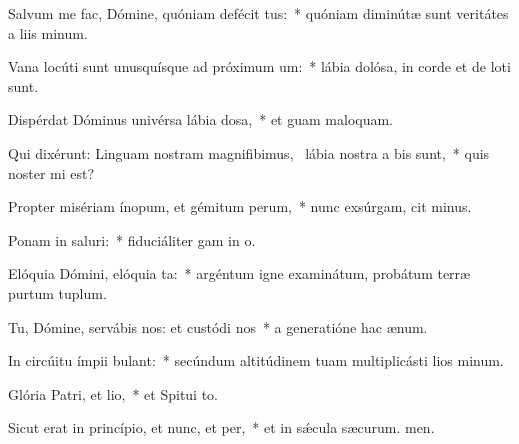 \item Salvum me fac, Dómine, quóniam defécit tus:~* quóniam diminútæ sunt veritátes a liis minum.
\item Vana locúti sunt unusquísque ad próximum um:~* lábia dolósa, in corde et de loti sunt.
\item Dispérdat Dóminus univérsa lábia dosa,~* et guam maloquam.
\item Qui dixérunt: Linguam nostram magnifibimus,~\pscross{} lábia nostra a bis sunt,~* quis noster mi est?
\item Propter misériam ínopum, et gémitum perum,~* nunc exsúrgam, cit minus.
\item Ponam in saluri:~* fiduciáliter gam in o.
\item Elóquia Dómini, elóquia ta:~* argéntum igne examinátum, probátum terræ purtum tuplum.
\item Tu, Dómine, servábis nos: et custódi nos~* a generatióne hac  ænum.
\item In circúitu ímpii bulant:~* secúndum altitúdinem tuam multiplicásti lios minum.
\item Glória Patri, et lio,~* et Spitui to.
\item Sicut erat in princípio, et nunc, et per,~* et in sǽcula sæcurum. men.
